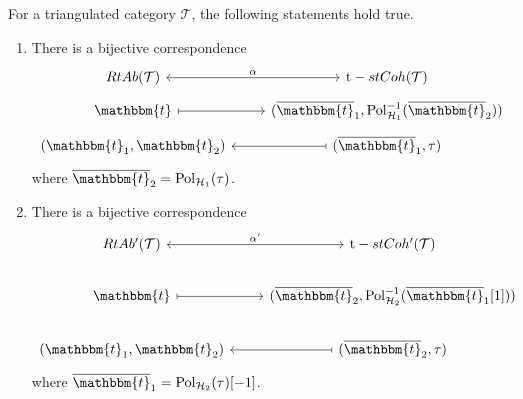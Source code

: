 \begin{thm}\label{thm:2.11}
  For a triangulated category $\mathcal{T}$, the following statements hold true.
  \begin{enumerate}[label=(\alph*)]
    \item There is a bijective correspondence
      \begin{equation*}
        \begin{tikzcd}[row sep=tiny]
          RtAb(\mathcal{T})\arrow[leftrightarrow]{r}{\alpha}
            & \mathrm{t}-stCoh(\mathcal{T})\\
          \mathbbm{t}\arrow[mapsto]{r}
            & (\overline{\mathbbm{t}}_1,\mathrm{Pol}^{-1}_{\mathcal{H}_1}(\overline{\mathbbm{t}}_2))\\
          (\mathbbm{t}_1,\mathbbm{t}_2)\arrow[mapsfrom]{r}
            & (\overline{\mathbbm{t}}_1,\tau)
        \end{tikzcd}
      \end{equation*}
      where $\overline{\mathbbm{t}}_2=\mathrm{Pol}_{\mathcal{H}_1}(\tau)$.
    \item There is a bijective correspondence
      \begin{equation*}
        \begin{tikzcd}
          RtAb^\prime(\mathcal{T})\arrow[leftrightarrow]{r}{\alpha'}
            & \mathrm{t}-stCoh^\prime(\mathcal{T})\\
          \mathbbm{t}\arrow[mapsto]{r}
            & (\overline{\mathbbm{t}}_2,\mathrm{Pol}^{-1}_{\mathcal{H}_2}(\overline{\mathbbm{t}}_1[1]))\\
          (\mathbbm{t}_1,\mathbbm{t}_2)\arrow[mapsfrom]{r}
            & (\overline{\mathbbm{t}}_2,\tau)
        \end{tikzcd}
      \end{equation*}
      where $\overline{\mathbbm{t}}_1=\mathrm{Pol}_{\mathcal{H}_2}(\tau)[-1]$.
  \end{enumerate}
\end{thm}


